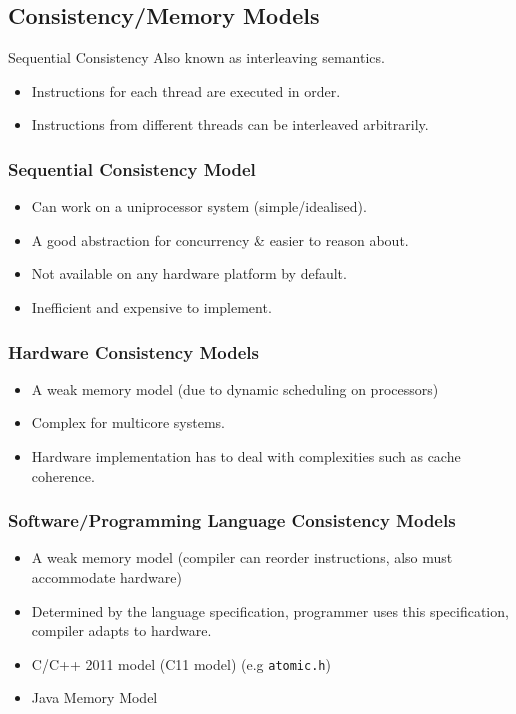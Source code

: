 \subsection{Consistency/Memory Models}
\begin{definitionbox}{Sequential Consistency}
    Also known as interleaving semantics.
    \begin{itemize}
        \item Instructions for each thread are executed in order.
        \item Instructions from different threads can be interleaved arbitrarily.
    \end{itemize}
\end{definitionbox}
\subsubsection{Sequential Consistency Model}
\begin{itemize}
    \item Can work on a uniprocessor system (simple/idealised).
    \item A good abstraction for concurrency \& easier to reason about.
    \item Not available on any hardware platform by default.
    \item Inefficient and expensive to implement.
\end{itemize}
\subsubsection{Hardware Consistency Models}
\begin{itemize}
    \item A weak memory model (due to dynamic scheduling on processors)
    \item Complex for multicore systems.
    \item Hardware implementation has to deal with complexities such as cache coherence.
\end{itemize}
\subsubsection{Software/Programming Language Consistency Models}
\begin{itemize}
    \item A weak memory model (compiler can reorder instructions, also must accommodate hardware)
    \item Determined by the language specification, programmer uses this specification, compiler adapts to hardware.
    \item C/C++ 2011 model (C11 model) (e.g \texttt{atomic.h})
    \item Java Memory Model
\end{itemize}

